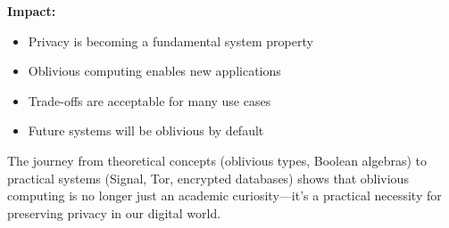 \documentclass[11pt,final]{article}
\begin{document}
\textbf{Impact:}
\begin{itemize}
    \item Privacy is becoming a fundamental system property
    \item Oblivious computing enables new applications
    \item Trade-offs are acceptable for many use cases
    \item Future systems will be oblivious by default
\end{itemize}

The journey from theoretical concepts (oblivious types, Boolean algebras) to practical systems (Signal, Tor, encrypted databases) shows that oblivious computing is no longer just an academic curiosity—it's a practical necessity for preserving privacy in our digital world.


\end{document}
